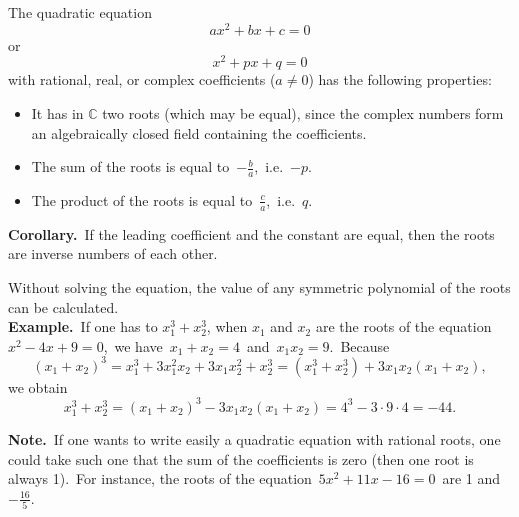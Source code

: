 \documentclass[12pt]{article}
\theoremstyle{definition}
\begin{document}
The quadratic equation
$$ax^2\!+\!bx\!+\!c = 0$$
or
$$x^2\!+\!px+\!q\! = 0$$
with rational, real,   or complex coefficients ($a \neq 0$) has the following properties:
\begin{itemize}
 \item It has in $\mathbb{C}$ two roots (which may be equal), since the complex numbers form an algebraically closed field containing the coefficients.
 \item The sum of the roots is equal to \,$-\frac{b}{a}$,\, i.e.\, $-p$.
 \item The product of the roots is equal to \,$\frac{c}{a}$,\, i.e.\, $q$.
\end{itemize}
\textbf{Corollary.}\, If the leading coefficient and the constant  are equal, then the roots are inverse numbers of each other.

Without solving the equation, the value of any symmetric polynomial 
of the roots can be calculated.\\

\textbf{Example.}\, If one has to  
$x_1^3\!+\!x_2^3$, when $x_1$ and $x_2$ are the roots of the 
equation\, $x^2\!-\!4x\!+\!9 = 0$,\, we have\, 
$x_1\!+\!x_2 = 4$\, and\, $x_1x_2 = 9$.\, Because
$$(x_1\!+\!x_2)^3 = 
x_1^3\!+\!3x_1^2x_2\!+\!3x_1x_2^2\!+\!x_2^3 = 
(x_1^3\!+\!x_2^3)\!+\!3x_1x_2(x_1\!+\!x_2),$$
we obtain
$$x_1^3\!+\!x_2^3 = (x_1\!+\!x_2)^3\!-\!3x_1x_2(x_1\!+\!x_2) = 4^3\!-\!3\cdot 9\cdot 4 = -44.$$

\textbf{Note.}\, If one wants to write easily a quadratic equation 
with rational roots, one could take such one that the sum of the 
coefficients is zero (then one root is always 1).\, For instance, 
the roots of the equation\, $5x^2\!+\!11x\!-\!16 = 0$\, are 1 and 
$-\frac{16}{5}$.
\end{document}
